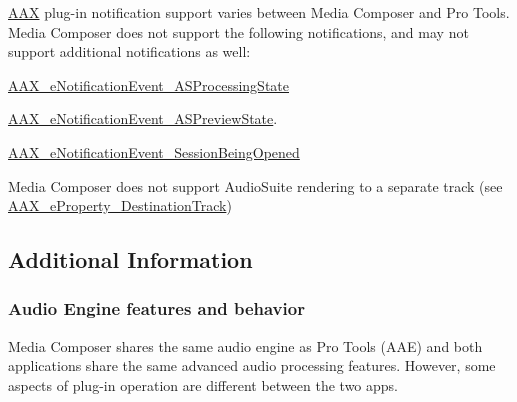\begin{DoxyItemize}
\item \mbox{\hyperlink{a00852}{A\+AX}} plug-\/in notification support varies between Media Composer and Pro Tools. Media Composer does not support the following notifications, and may not support additional notifications as well\+: \begin{DoxyItemize}
\item \mbox{\hyperlink{a00491_afab5ea2cfd731fc8f163b6caa685406eaa55c7e25741c0d4f81cc49394e96a43c}{A\+A\+X\+\_\+e\+Notification\+Event\+\_\+\+A\+S\+Processing\+State}} \item \mbox{\hyperlink{a00491_afab5ea2cfd731fc8f163b6caa685406ea8ca3f7d5e93eecf945682f6fc55f5263}{A\+A\+X\+\_\+e\+Notification\+Event\+\_\+\+A\+S\+Preview\+State}}. \item \mbox{\hyperlink{a00491_afab5ea2cfd731fc8f163b6caa685406ea013a21c2c111bac54b962b40f1b4bc1f}{A\+A\+X\+\_\+e\+Notification\+Event\+\_\+\+Session\+Being\+Opened}}\end{DoxyItemize}



\item Media Composer does not support Audio\+Suite rendering to a separate track (see \mbox{\hyperlink{a00662_a13e384f22825afd3db6d68395b79ce0dadd8839e5678c8880215e318197cc8d3a}{A\+A\+X\+\_\+e\+Property\+\_\+\+Destination\+Track}})  
\end{DoxyItemize}



 \hypertarget{a00831_aax_media_composer_guide__additional_information}{}\subsection{Additional Information}\label{a00831_aax_media_composer_guide__additional_information}
 \hypertarget{a00831_subsection__aax_media_composer_guide__audio_engine}{}\subsubsection{Audio Engine features and behavior}\label{a00831_subsection__aax_media_composer_guide__audio_engine}
Media Composer shares the same audio engine as Pro Tools (A\+AE) and both applications share the same advanced audio processing features. However, some aspects of plug-\/in operation are different between the two apps.

